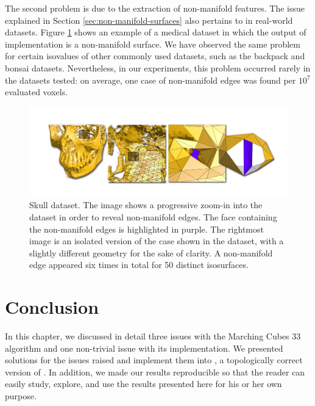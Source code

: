 The second problem is due to the extraction of non-manifold features. The issue explained in Section \ref{sec:non-manifold-surfaces} also pertains to in real-world datasets.  Figure \ref{fig:non-manifold-real-data} shows an example of a medical dataset in which the output of \mc{} implementation is a non-manifold surface. We have observed the same problem for certain isovalues of other commonly used datasets, such as the backpack and bonsai datasets. Nevertheless, in our experiments, this problem occurred  rarely in the datasets tested:  on average, one case of non-manifold edges was found per $10^7$ evaluated voxels.

\begin{figure}[t]
     \centering
     \includegraphics[width=1\linewidth]{chapter4/figures/skull.png}
     \caption{Skull dataset. The image shows a progressive zoom-in into the dataset in order to reveal non-manifold edges. The face containing the non-manifold edges is highlighted  in purple. The rightmost image is an isolated version of the case shown in the dataset, with a slightly different geometry for the sake of clarity. A non-manifold edge appeared six times in total for 50 distinct isosurfaces.}
     \label{fig:non-manifold-real-data}
\end{figure}

\section{Conclusion}
\label{conclusion}

In this chapter, we discussed in detail three issues with  the Marching Cubes 33 algorithm and one non-trivial issue with its implementation. 
We presented solutions for the issues raised and implement them into \cmc, a topologically correct version of \mc. In addition, we made our results reproducible so that the reader can easily study, explore, and use the results presented here for his or her own purpose. 


